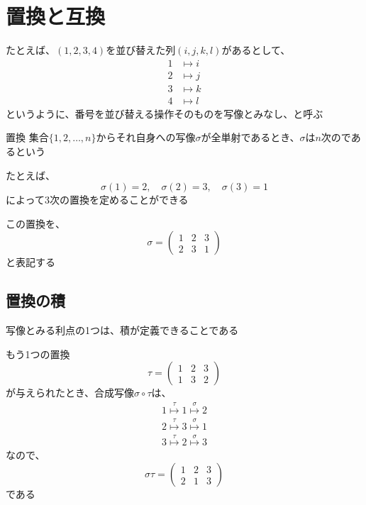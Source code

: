 \documentclass[../../../topic_linear-algebra]{subfiles}
\begin{document}
\sectionline
\section{置換と互換}

たとえば、$(1,2,3,4)$を並び替えた列$(i,j,k,l)$があるとして、
\begin{align*}
  1 & \longmapsto i \\
  2 & \longmapsto j \\
  3 & \longmapsto k \\
  4 & \longmapsto l
\end{align*}
というように、番号を並び替える操作そのものを写像とみなし、と呼ぶ

\begin{definition}{置換}
  集合$\{ 1,2,\ldots,n \}$からそれ自身への写像$\sigma$が全単射であるとき、$\sigma$は$n$次のであるという
\end{definition}

たとえば、
\begin{equation*}
  \sigma(1) = 2, \quad \sigma(2) = 3, \quad \sigma(3) = 1
\end{equation*}
によって3次の置換を定めることができる

この置換を、
\begin{equation*}
  \sigma = \begin{pmatrix}
    1 & 2 & 3 \\
    2 & 3 & 1
  \end{pmatrix}
\end{equation*}
と表記する

\subsection{置換の積}

写像とみる利点の1つは、積が定義できることである

\br

もう1つの置換
\begin{equation*}
  \tau = \begin{pmatrix}
    1 & 2 & 3 \\
    1 & 3 & 2
  \end{pmatrix}
\end{equation*}
が与えられたとき、合成写像$\sigma \circ \tau$は、
\begin{gather*}
  1 \overset{\tau}{\longmapsto} 1 \overset{\sigma}{\longmapsto} 2 \\
  2 \overset{\tau}{\longmapsto} 3 \overset{\sigma}{\longmapsto} 1 \\
  3 \overset{\tau}{\longmapsto} 2 \overset{\sigma}{\longmapsto} 3
\end{gather*}
なので、
\begin{equation*}
  \sigma \tau = \begin{pmatrix}
    1 & 2 & 3 \\
    2 & 1 & 3
  \end{pmatrix}
\end{equation*}
である
\end{document}
